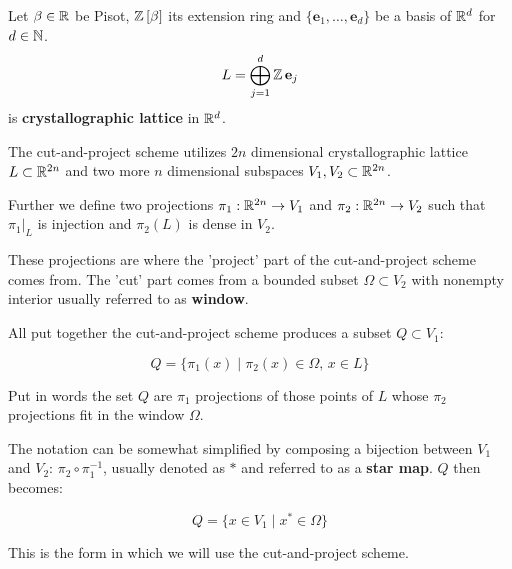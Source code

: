 \documentclass[text.tex]{subfiles}
\begin{document}
\begin{definition}
Let $\beta\in\mathbb{R}$ be Pisot, $\mathbb{Z}\left[\beta\right]$ its extension ring and $\{\mathbf{e}_1, \dots, \mathbf{e}_d\}$ be a basis of $\mathbb{R}^d$ for $d\in\mathbb{N}$. 
$$L = \bigoplus^d_{j=1}\mathbb{Z}\, \mathbf{e}_j$$
is \textbf{crystallographic lattice} in $\mathbb{R}^d$.
\end{definition} 

The cut-and-project scheme utilizes $2n$ dimensional crystallographic lattice $L\subset\mathbb{R}^{2n}$ and two more $n$ dimensional subspaces $V_1, V_2\subset\mathbb{R}^{2n}$. 

Further we define two projections $\pi_1:\mathbb{R}^{2n}\rightarrow V_1$ and $\pi_2:\mathbb{R}^{2n}\rightarrow V_2$ such that $\pi_1|_L$ is injection and $\pi_2(L)$ is dense in $V_2$. 

These projections are where the 'project' part of the cut-and-project scheme comes from. The 'cut' part comes from a bounded subset $\Omega\subset V_2$ with nonempty interior usually referred to as \textbf{window}. 

All put together the cut-and-project scheme produces a subset $Q\subset V_1$:

$$Q = \{ \pi_1(x)\; |\; \pi_2(x)\in \Omega,\,  x\in L \}$$

Put in words the set $Q$ are $\pi_1$ projections of those points of $L$ whose $\pi_2$ projections fit in the window $\Omega$. 

The notation can be somewhat simplified by composing a bijection between $V_1$ and $V_2$: $\pi_2\circ\pi^{-1}_1$, usually denoted as $\ast$ and referred to as a \textbf{star map}. $Q$ then becomes:

$$Q = \{ x \in V_1\; |\; x^\ast\in \Omega \}$$

This is the form in which we will use the cut-and-project scheme. 
\end{document}
